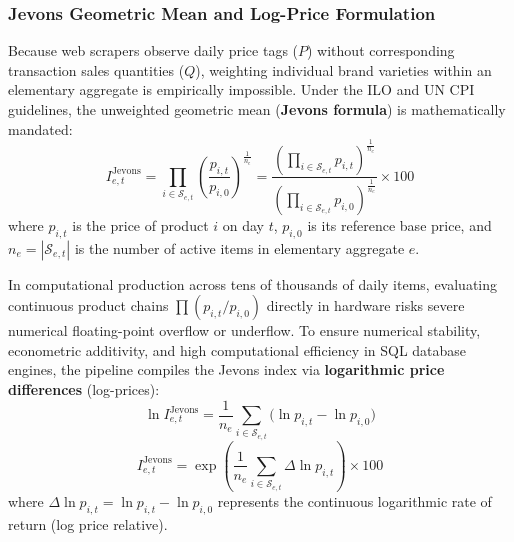 \subsubsection{Jevons Geometric Mean and Log-Price Formulation}
\hs Because web scrapers observe daily price tags ($P$) without corresponding transaction sales quantities ($Q$), weighting individual brand varieties within an elementary aggregate is empirically impossible. Under the ILO and UN CPI guidelines, the unweighted geometric mean (\textbf{Jevons formula}) is mathematically mandated:
\begin{equation}
    I_{e, t}^{\text{Jevons}} = \prod_{i \in \mathcal{S}_{e, t}} \left( \frac{p_{i, t}}{p_{i, 0}} \right)^{\frac{1}{n_e}} = \frac{\left( \prod_{i \in \mathcal{S}_{e, t}} p_{i, t} \right)^{\frac{1}{n_e}}}{\left( \prod_{i \in \mathcal{S}_{e, t}} p_{i, 0} \right)^{\frac{1}{n_e}}} \times 100
\end{equation}
where $p_{i, t}$ is the price of product $i$ on day $t$, $p_{i, 0}$ is its reference base price, and $n_e = |\mathcal{S}_{e, t}|$ is the number of active items in elementary aggregate $e$.

\hs In computational production across tens of thousands of daily items, evaluating continuous product chains $\prod (p_{i, t} / p_{i, 0})$ directly in hardware risks severe numerical floating-point overflow or underflow. To ensure numerical stability, econometric additivity, and high computational efficiency in SQL database engines, the pipeline compiles the Jevons index via \textbf{logarithmic price differences} (log-prices):
\begin{equation}
    \ln I_{e, t}^{\text{Jevons}} = \frac{1}{n_e} \sum_{i \in \mathcal{S}_{e, t}} \Big( \ln p_{i, t} - \ln p_{i, 0} \Big)
\end{equation}
\begin{equation}
    I_{e, t}^{\text{Jevons}} = \exp\left( \frac{1}{n_e} \sum_{i \in \mathcal{S}_{e, t}} \Delta \ln p_{i, t} \right) \times 100
\end{equation}
where $\Delta \ln p_{i, t} = \ln p_{i, t} - \ln p_{i, 0}$ represents the continuous logarithmic rate of return (log price relative).

